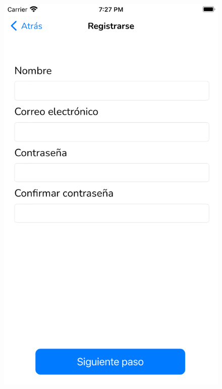 \begin{appendices}
\begin{figure}[H]
\begin{minipage}{0.3\textwidth}
        \includegraphics[cframe=black 2pt, width=1\linewidth]{images/manual/registro1.png}
    \end{minipage}
    \begin{minipage}{0.3\textwidth}
        \centering

\end{minipage}
\end{figure}
\end{appendices}
